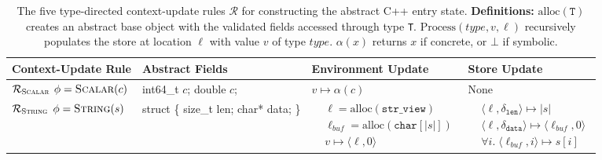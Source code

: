 \begin{table}[htbp]
  \centering
  \caption{The five type-directed context-update rules $\mathcal{R}$ for constructing the abstract C++ entry state.
  \textbf{Definitions:} $\text{alloc}(\texttt{T})$ creates an abstract base object with the validated fields accessed through type \texttt{T}.
  $\text{Process}(\mathit{type}, v, \ell)$ recursively populates the store at location $\ell$ with value $v$ of type $\mathit{type}$.
  $\alpha(x)$ returns $x$ if concrete, or $\bot$ if symbolic.}
  \label{tab:semantic-rules}
  
  \newcommand{\thickhline}{\noalign{\hrule}}
  
  \renewcommand{\arraystretch}{1.5}
  \scriptsize
  
  \begin{tabular}{m{}|m{}|>{\raggedright\arraybackslash}m{}|>{\raggedright\arraybackslash}m{}}
    \thickhline
    \textbf{Context-Update Rule} & \textbf{Abstract Fields} & \textbf{Environment Update} & \textbf{Store Update} \\
    \hline
    
    $\mathcal{R}_{\textsc{Scalar}}$ \newline $\phi=\textsc{Scalar}(c)$ &
    {\ttfamily int64\_t $c$; \newline double $c$;} &
    $v \mapsto \alpha(c)$ &
    None \\ \hline
    
    $\mathcal{R}_{\textsc{String}}$ \newline $\phi=\textsc{String}(s)$ &
    {\ttfamily struct \{ \newline \hspace*{0.8em} size\_t len; \newline \hspace*{0.8em} char* data; \newline \}} &
    $\begin{aligned}
      & \ell = \text{alloc}(\texttt{str\_view}) \\
      & \ell_{buf} = \text{alloc}(\texttt{char}[|s|]) \\
      & v \mapsto \langle\ell, 0\rangle
    \end{aligned}$ &
    $\begin{aligned}
      & \langle \ell, \delta_{\texttt{len}} \rangle \mapsto |s| \\
      & \langle \ell, \delta_{\texttt{data}} \rangle \mapsto \langle\ell_{buf}, 0\rangle \\
      & \forall i.\; \langle \ell_{buf}, i \rangle \mapsto s[i]
    \end{aligned}$
    \\ \hline
    

\end{tabular}
\end{table}
